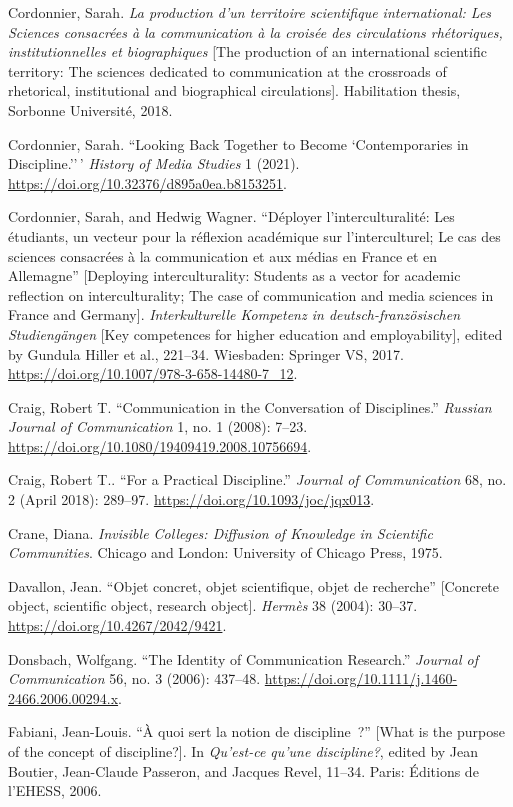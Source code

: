 \documentclass{tufte-handout}
\begin{document}
\begin{hangparas}{.25in}{1}
Cordonnier, Sarah. \emph{La production d'un territoire scientifique
international: Les Sciences consacrées à la communication à la croisée
des circulations rhétoriques, institutionnelles et biographiques} {[}The
production of an international scientific territory: The sciences
dedicated to communication at the crossroads of rhetorical,
institutional and biographical circulations{]}. Habilitation thesis,
Sorbonne Université, 2018.

Cordonnier, Sarah. ``Looking Back Together to Become `Contemporaries in
Discipline.''\,' \emph{History of Media Studies} 1 (2021).
\url{https://doi.org/10.32376/d895a0ea.b8153251}.

Cordonnier, Sarah, and Hedwig Wagner. ``Déployer l'interculturalité: Les
étudiants, un vecteur pour la réflexion académique sur l'interculturel;
Le cas des sciences consacrées à la communication et aux médias en
France et en Allemagne'' {[}Deploying interculturality: Students as a
vector for academic reflection on interculturality; The case of
communication and media sciences in France and Germany{]}.
\emph{Interkulturelle Kompetenz in deutsch-französischen Studiengängen}
{[}Key competences for higher education and employability{]}, edited by
Gundula Hiller et al., 221--34. Wiesbaden: Springer VS, 2017.
\url{https://doi.org/10.1007/978-3-658-14480-7_12}.

Craig, Robert T. ``Communication in the Conversation of Disciplines.''
\emph{Russian Journal of Communication} 1, no. 1 (2008): 7--23.
\url{https://doi.org/10.1080/19409419.2008.10756694}.

Craig, Robert T.. ``For a Practical Discipline.'' \emph{Journal of
Communication} 68, no. 2 (April 2018): 289--97.
\url{https://doi.org/10.1093/joc/jqx013}.

Crane, Diana. \emph{Invisible Colleges: Diffusion of Knowledge in
Scientific Communities}. Chicago and London: University of Chicago
Press, 1975.

Davallon, Jean. ``Objet concret, objet scientifique, objet de
recherche'' {[}Concrete object, scientific object, research object{]}.
\emph{Hermès} 38 (2004): 30--37.
\url{https://doi.org/10.4267/2042/9421}.

Donsbach, Wolfgang. ``The Identity of Communication Research.''
\emph{Journal of Communication} 56, no. 3 (2006): 437--48.
\url{https://doi.org/10.1111/j.1460-2466.2006.00294.x}.

Fabiani, Jean-Louis. ``À quoi sert la notion de discipline~?'' {[}What
is the purpose of the concept of discipline?{]}. In \emph{Qu'est-ce
qu'une discipline?}, edited by Jean Boutier, Jean-Claude Passeron, and
Jacques Revel, 11--34. Paris: Éditions de l'EHESS, 2006.


\end{hangparas}
\end{document}
